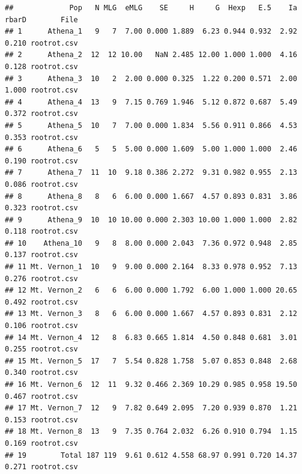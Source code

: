 \documentclass[letterpaper]{article}\usepackage[]{graphicx}\usepackage[]{color}
\makeatletter
\newenvironment{kframe}{%
 \def\at@end@of@kframe{}%
 \ifinner\ifhmode%
  \def\at@end@of@kframe{\end{minipage}}%
  \begin{minipage}{\columnwidth}%
 \fi\fi%
 \def\FrameCommand##1{\hskip\@totalleftmargin \hskip-\fboxsep
 \colorbox{shadecolor}{##1}\hskip-\fboxsep
     \hskip-\linewidth \hskip-\@totalleftmargin \hskip\columnwidth}%
 \MakeFramed {\advance\hsize-\width
   \@totalleftmargin\z@ \linewidth\hsize
   \@setminipage}}%
 {\par\unskip\endMakeFramed%
 \at@end@of@kframe}
\newenvironment{knitrout}{}{} %
\makeatother
\begin{document}
\begin{knitrout}\footnotesize
{}\color{fgcolor}\begin{kframe}
\begin{verbatim}
##             Pop   N MLG  eMLG    SE     H     G  Hexp   E.5    Ia rbarD        File
## 1      Athena_1   9   7  7.00 0.000 1.889  6.23 0.944 0.932  2.92 0.210 rootrot.csv
## 2      Athena_2  12  12 10.00   NaN 2.485 12.00 1.000 1.000  4.16 0.128 rootrot.csv
## 3      Athena_3  10   2  2.00 0.000 0.325  1.22 0.200 0.571  2.00 1.000 rootrot.csv
## 4      Athena_4  13   9  7.15 0.769 1.946  5.12 0.872 0.687  5.49 0.372 rootrot.csv
## 5      Athena_5  10   7  7.00 0.000 1.834  5.56 0.911 0.866  4.53 0.353 rootrot.csv
## 6      Athena_6   5   5  5.00 0.000 1.609  5.00 1.000 1.000  2.46 0.190 rootrot.csv
## 7      Athena_7  11  10  9.18 0.386 2.272  9.31 0.982 0.955  2.13 0.086 rootrot.csv
## 8      Athena_8   8   6  6.00 0.000 1.667  4.57 0.893 0.831  3.86 0.323 rootrot.csv
## 9      Athena_9  10  10 10.00 0.000 2.303 10.00 1.000 1.000  2.82 0.118 rootrot.csv
## 10    Athena_10   9   8  8.00 0.000 2.043  7.36 0.972 0.948  2.85 0.137 rootrot.csv
## 11 Mt. Vernon_1  10   9  9.00 0.000 2.164  8.33 0.978 0.952  7.13 0.276 rootrot.csv
## 12 Mt. Vernon_2   6   6  6.00 0.000 1.792  6.00 1.000 1.000 20.65 0.492 rootrot.csv
## 13 Mt. Vernon_3   8   6  6.00 0.000 1.667  4.57 0.893 0.831  2.12 0.106 rootrot.csv
## 14 Mt. Vernon_4  12   8  6.83 0.665 1.814  4.50 0.848 0.681  3.01 0.255 rootrot.csv
## 15 Mt. Vernon_5  17   7  5.54 0.828 1.758  5.07 0.853 0.848  2.68 0.340 rootrot.csv
## 16 Mt. Vernon_6  12  11  9.32 0.466 2.369 10.29 0.985 0.958 19.50 0.467 rootrot.csv
## 17 Mt. Vernon_7  12   9  7.82 0.649 2.095  7.20 0.939 0.870  1.21 0.153 rootrot.csv
## 18 Mt. Vernon_8  13   9  7.35 0.764 2.032  6.26 0.910 0.794  1.15 0.169 rootrot.csv
## 19        Total 187 119  9.61 0.612 4.558 68.97 0.991 0.720 14.37 0.271 rootrot.csv
\end{verbatim}
\end{kframe}
\end{knitrout}
\end{document}
